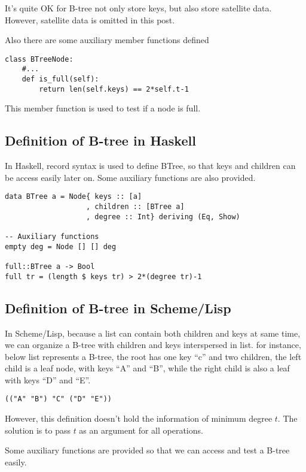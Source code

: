\documentclass{article}
\begin{document}
It's quite OK for B-tree not only store keys, but also store satellite data.
However, satellite data is omitted in this post.

Also there are some auxiliary member functions defined

\begin{lstlisting}
class BTreeNode:
    #...
    def is_full(self):
        return len(self.keys) == 2*self.t-1
\end{lstlisting}

This member function is used to test if a node is full.

\subsection*{Definition of B-tree in Haskell}
In Haskell, record syntax is used to define BTree, so that keys and children
can be access easily later on. Some auxiliary functions are also provided.

\lstset{language=Haskell}
\begin{lstlisting}
data BTree a = Node{ keys :: [a]
                   , children :: [BTree a]
                   , degree :: Int} deriving (Eq, Show)

-- Auxiliary functions
empty deg = Node [] [] deg

full::BTree a -> Bool
full tr = (length $ keys tr) > 2*(degree tr)-1
\end{lstlisting} %

\subsection*{Definition of B-tree in Scheme/Lisp}
In Scheme/Lisp, because a list can contain both children and keys at
same time, we can organize a B-tree with children and keys interspersed
in list. for instance, below list represents a B-tree, the root has one
key ``c'' and two children, the left child is a leaf node, with keys ``A''
and ``B'', while the right child is also a leaf with keys ``D'' and ``E''.

\lstset{language=lisp}
\begin{lstlisting}
(("A" "B") "C" ("D" "E"))
\end{lstlisting}

However, this definition doesn't hold the information of minimum degree $t$.
The solution is to pass $t$ as an argument for all operations.

Some auxiliary functions are provided so that we can access and test a
B-tree easily.
\end{document}
